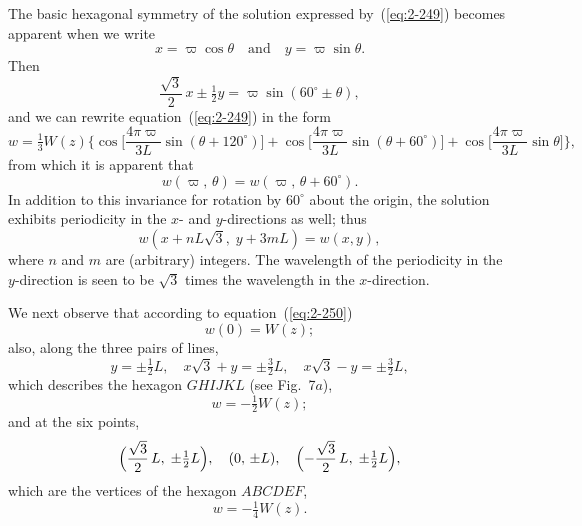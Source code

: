 The basic hexagonal symmetry of the solution expressed by~(\ref{eq:2-249}) becomes
apparent when we write
\begin{equation}
\label{eq:2-253}
x = \varpi\cos\theta \quad\text{and}\quad y = \varpi\sin\theta.
\end{equation}
Then
\begin{equation}
\label{eq:2-254}
\frac{\sqrt{3}}{2}\,x \pm \tfrac{1}{2}y = \varpi\sin(60^\circ \pm \theta),
\end{equation}
and we can rewrite equation~(\ref{eq:2-249}) in the form
\begin{equation}
\label{eq:2-255}
w = \tfrac{1}{3}W(z)\biggl\{\cos\biggl[\frac{4\pi\varpi}{3L}\sin(\theta+120^\circ)\biggr] + \cos\biggl[\frac{4\pi\varpi}{3L}\sin(\theta+60^\circ)\biggr] + \cos\biggl[\frac{4\pi\varpi}{3L}\sin\theta\biggr]\biggr\},
\end{equation}
from which it is apparent that
\begin{equation}
\label{eq:2-256}
w(\varpi,\,\theta) = w(\varpi,\,\theta+60^\circ).
\end{equation}
In addition to this invariance for rotation by $60^\circ$ about the origin, the
solution exhibits periodicity in the $x$- and $y$-directions as well; thus
\begin{equation}
\label{eq:2-257}
w(x+nL\sqrt{3},\; y+3mL) = w(x,y),
\end{equation}
where $n$ and $m$ are (arbitrary) integers. The wavelength of the periodicity
in the $y$-direction is seen to be $\sqrt{3}$ times the wavelength in the $x$-direction.

We next observe that according to equation~(\ref{eq:2-250})
\begin{equation}
\label{eq:2-258}
w(0) = W(z);
\end{equation}
also, along the three pairs of lines,
\begin{equation}
\label{eq:2-259}
y = \pm\tfrac{1}{2}L, \quad x\sqrt{3}+y = \pm\tfrac{3}{2}L, \quad x\sqrt{3}-y = \pm\tfrac{3}{2}L,
\end{equation}
which describes the hexagon $GHIJKL$ (see Fig.~7$a$),
\begin{equation}
\label{eq:2-260}
w = -\tfrac{1}{2}W(z);
\end{equation}
and at the six points,
\begin{equation}
\label{eq:2-261}
\Bigl(\frac{\sqrt{3}}{2}\,L,\;\pm\tfrac{1}{2}L\Bigr), \quad (0,\,\pm L), \quad \Bigl(-\frac{\sqrt{3}}{2}\,L,\;\pm\tfrac{1}{2}L\Bigr),
\end{equation}
which are the vertices of the hexagon $ABCDEF$,
\begin{equation}
\label{eq:2-262}
w = -\tfrac{1}{4}W(z).
\end{equation}

